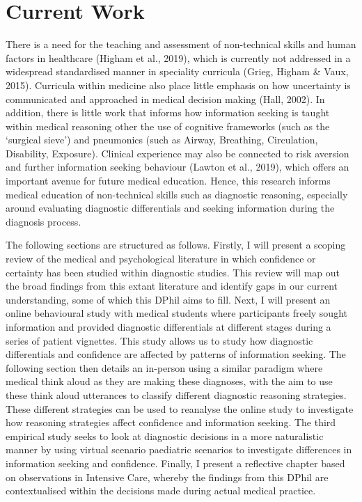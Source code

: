 \documentclass[a4paper, nobind]{templates/ociamthesis}
\begin{document}
\hypertarget{current-work}{%
\section*{Current Work}\label{current-work}}

There is a need for the teaching and assessment of non-technical skills and human factors in healthcare (Higham et al., 2019), which is currently not addressed in a widespread standardised manner in speciality curricula (Grieg, Higham \& Vaux, 2015). Curricula within medicine also place little emphasis on how uncertainty is communicated and approached in medical decision making (Hall, 2002). In addition, there is little work that informs how information seeking is taught within medical reasoning other the use of cognitive frameworks (such as the `surgical sieve') and pneumonics (such as Airway, Breathing, Circulation, Disability, Exposure). Clinical experience may also be connected to risk aversion and further information seeking behaviour (Lawton et al., 2019), which offers an important avenue for future medical education. Hence, this research informs medical education of non-technical skills such as diagnostic reasoning, especially around evaluating diagnostic differentials and seeking information during the diagnosis process.

The following sections are structured as follows. Firstly, I will present a scoping review of the medical and psychological literature in which confidence or certainty has been studied within diagnostic studies. This review will map out the broad findings from this extant literature and identify gaps in our current understanding, some of which this DPhil aims to fill. Next, I will present an online behavioural study with medical students where participants freely sought information and provided diagnostic differentials at different stages during a series of patient vignettes. This study allows us to study how diagnostic differentials and confidence are affected by patterns of information seeking. The following section then details an in-person using a similar paradigm where medical think aloud as they are making these diagnoses, with the aim to use these think aloud utterances to classify different diagnostic reasoning strategies. These different strategies can be used to reanalyse the online study to investigate how reasoning strategies affect confidence and information seeking. The third empirical study seeks to look at diagnostic decisions in a more naturalistic manner by using virtual scenario paediatric scenarios to investigate differences in information seeking and confidence. Finally, I present a reflective chapter based on observations in Intensive Care, whereby the findings from this DPhil are contextualised within the decisions made during actual medical practice.
\end{document}
